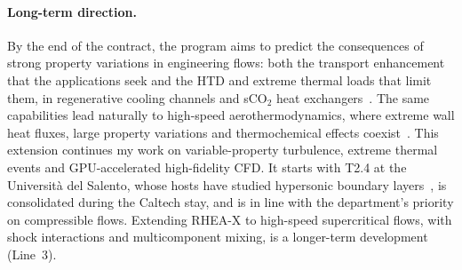 \documentclass[11pt]{article}
\begin{document}
\paragraph{Long-term direction.} By the end of the contract, the program aims to predict the
consequences of strong property variations in engineering flows: both the transport
enhancement that the applications seek and the HTD and extreme thermal loads that limit them, in
regenerative cooling channels and sCO$_2$ heat exchangers~\cite{Pizzarelli2018,Ahn2015}. The
same capabilities lead naturally to high-speed aerothermodynamics, where extreme wall heat
fluxes, large property variations and thermochemical effects
coexist~\cite{Urzay2018,DiRenzoUrzay2021,Passiatore2022}. This extension continues my work on
variable-property turbulence, extreme thermal events and GPU-accelerated high-fidelity CFD. It
starts with T2.4 at the Universit\`a del Salento, whose hosts have studied hypersonic
boundary layers~\cite{DiRenzoUrzay2021,Passiatore2022}, is consolidated during the Caltech stay, and
is in line with the department's priority on compressible flows. Extending RHEA-X to high-speed
supercritical flows, with shock interactions and multicomponent mixing, is a longer-term development
(Line~3).
\end{document}
